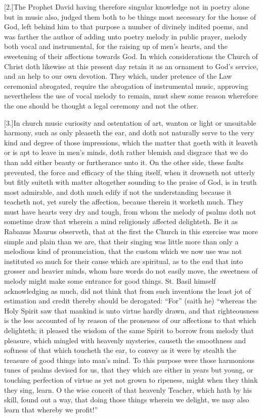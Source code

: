[2.]The Prophet David having therefore singular knowledge not in poetry alone but in music also, judged them both to be things most necessary for the house of God, left behind him to that purpose a number of divinely indited poems, and was farther the author of adding unto poetry melody in public prayer, melody both vocal and instrumental, for the raising up of men’s hearts, and the sweetening of their affections towards God. In which considerations the Church of Christ doth likewise at this present day retain it as an ornament to God’s service, and an help to our own  devotion.
 They which, under pretence of the Law ceremonial abrogated, require the abrogation of instrumental music, approving nevertheless the use of vocal melody to remain, must shew some reason wherefore the one should be thought a legal ceremony and not the other.

[3.]In church music curiosity and ostentation of art, wanton or light or unsuitable harmony, such as only pleaseth the ear, and doth not naturally serve to the very kind and degree of those impressions, which the matter that goeth with it leaveth or is apt to leave in men’s minds, doth rather blemish and disgrace that we do than add either beauty or furtherance unto it. On the other side, these faults prevented, the force and efficacy of the thing itself, when it drowneth not utterly but fitly suiteth with matter altogether sounding to the praise of God, is in truth most admirable, and doth much edify if not the understanding because it teacheth not, yet surely the affection, because therein it worketh much. They must  have hearts very dry and tough, from whom the melody of psalms doth not sometime draw that wherein a mind religiously affected delighteth. Be it as Rabanus Maurus observeth, that at the first the Church in this exercise was more simple and plain than we are, that their singing was little more than only a melodious kind of pronunciation, that the custom which we now use was not instituted so much for their cause which are spiritual, as to the end that into grosser and heavier minds, whom bare words do not easily move, the sweetness of melody might make some entrance for good things. St. Basil himself acknowledging as much, did not think that from such inventions the least jot of estimation and credit thereby should be derogated: “For” (saith he) “whereas the Holy Spirit saw that mankind is unto virtue hardly drawn, and that righteousness is the less accounted of by reason of the proneness of our affections to that which delighteth; it pleased the wisdom of the same Spirit to borrow from melody that pleasure, which mingled with heavenly mysteries, causeth the smoothness and softness of that which toucheth the ear, to convey as it were by stealth the treasure of good things into man’s mind. To this purpose were those harmonious tunes of psalms devised for us, that they which are either in years but young, or touching perfection of virtue as yet not grown to ripeness, might when they think they sing, learn. O the wise conceit of that heavenly Teacher, which hath by his skill, found out a way, that doing those things wherein we delight, we may also learn that whereby we profit!”




